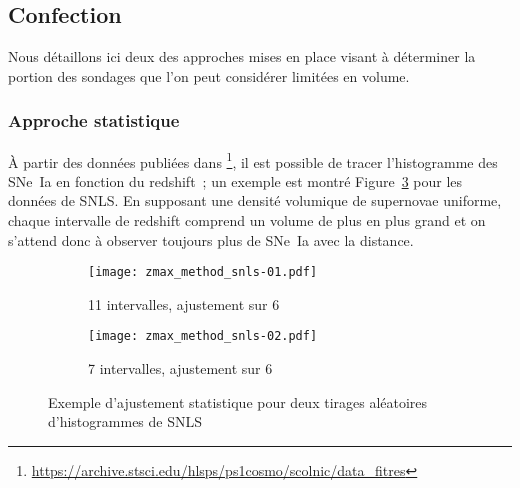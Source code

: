 \documentclass[../main/main.tex]{subfiles}
\begin{document}
\subsection{Confection}\label{ssec:cuts}

Nous détaillons ici deux des approches mises en place visant à déterminer la
portion des sondages que l'on peut considérer limitées en volume.

\subsubsection{Approche statistique}\label{sssec:baserate}

À partir des données publiées dans \cite{scolnic2018}\footnote{\href{
https://archive.stsci.edu/hlsps/ps1cosmo/scolnic/data_fitres/}
{https://archive.stsci.edu/hlsps/ps1cosmo/scolnic/data\_fitres}}, il est
possible de tracer l'histogramme des SNe~Ia en fonction du redshift~; un exemple
est montré Figure~\ref{fig:zmax_method} pour les données de SNLS. En supposant
une densité volumique de supernovae uniforme, chaque intervalle de redshift
comprend un volume de plus en plus grand et on s'attend donc à observer toujours
plus de SNe~Ia avec la distance.

\begin{figure}[]
    \centering
    \begin{subfigure}[]{.49\linewidth}
        \centering
        \texttt{[image: zmax\_method\_snls-01.pdf]}
        \captionsetup{justification=centering}
        \caption{11 intervalles, ajustement sur 6}
        \label{fig:zmax_method1}
    \end{subfigure}
    \begin{subfigure}[]{.49\linewidth}
        \centering
        \texttt{[image: zmax\_method\_snls-02.pdf]}
        \captionsetup{justification=centering}
        \caption{7 intervalles, ajustement sur 6}
        \label{fig:zmax_method2}
    \end{subfigure}
    \captionsetup{justification=centering}
    \caption{Exemple d'ajustement statistique pour deux tirages aléatoires
    d'histogrammes de SNLS}
    \label{fig:zmax_method}
\end{figure}
\end{document}
